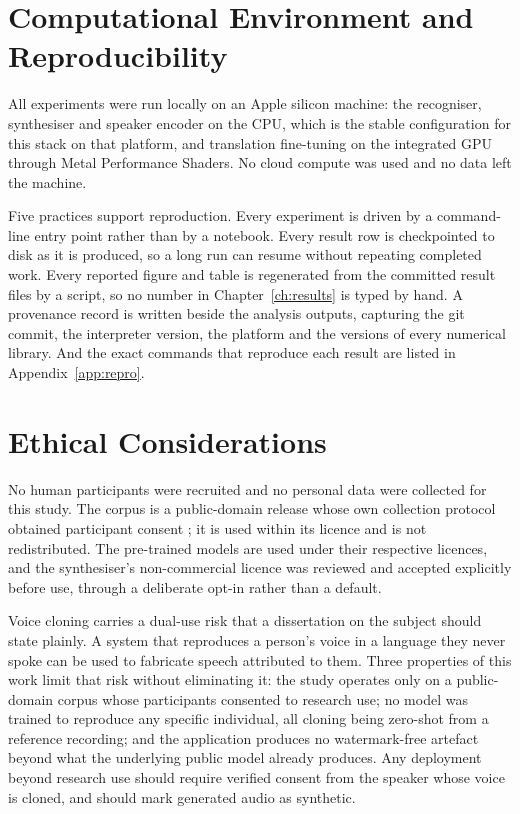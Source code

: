 \section{Computational Environment and Reproducibility}
\label{sec:reproducibility}

All experiments were run locally on an Apple silicon machine: the recogniser, synthesiser and
speaker encoder on the CPU, which is the stable configuration for this stack on that platform, and
translation fine-tuning on the integrated GPU through Metal Performance Shaders. No cloud compute
was used and no data left the machine.

Five practices support reproduction. Every experiment is driven by a command-line entry point
rather than by a notebook. Every result row is checkpointed to disk as it is produced, so a long
run can resume without repeating completed work. Every reported figure and table is regenerated
from the committed result files by a script, so no number in Chapter~\ref{ch:results} is typed by
hand. A provenance record is written beside the analysis outputs, capturing the git commit, the
interpreter version, the platform and the versions of every numerical library. And the exact
commands that reproduce each result are listed in Appendix~\ref{app:repro}.

\section{Ethical Considerations}
\label{sec:ethics}

No human participants were recruited and no personal data were collected for this study. The
corpus is a public-domain release whose own collection protocol obtained participant consent
\cite{ward2023dral}; it is used within its licence and is not redistributed. The pre-trained
models are used under their respective licences, and the synthesiser's non-commercial licence was
reviewed and accepted explicitly before use, through a deliberate opt-in rather than a default.

Voice cloning carries a dual-use risk that a dissertation on the subject should state plainly. A
system that reproduces a person's voice in a language they never spoke can be used to fabricate
speech attributed to them. Three properties of this work limit that risk without eliminating it:
the study operates only on a public-domain corpus whose participants consented to research use; no
model was trained to reproduce any specific individual, all cloning being zero-shot from a
reference recording; and the application produces no watermark-free artefact beyond what the
underlying public model already produces. Any deployment beyond research use should require
verified consent from the speaker whose voice is cloned, and should mark generated audio as
synthetic.
